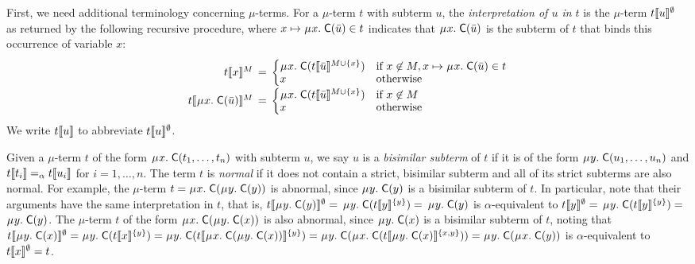 First, we need additional terminology concerning $\mu$-terms.
For a $\mu$-term $t$ with subterm $u$,
the \emph{interpretation of\/ $u$ in\/ $t$} is the $\mu$-term $t\llbracket u \rrbracket^\emptyset$ as returned by the following recursive procedure,
where $x \mapsto \MU x.\; \const{C}( \vec u ) \in t$ indicates that $\MU x.\; \const{C}( \vec u )$ is the subterm of $t$ that binds this occurrence of variable $x$:
\[\begin{array}{r@{}c@{}l}
t\interp{x}^M & {} \,=\, {} &
\textstyle\begin{cases}
    \MU x.\; \const{C}( t\interp{ \vec u}^{M \mathrel\cup \{ x \}}) & \text{if }x \not\in M, x \mapsto \MU x.\; \const{C}( \vec u ) \in t  \\[-\jot]
    x & \text{otherwise}
\end{cases} \\
t\interp{\MU x.\; \const{C}( \vec u )}^M & = &
\textstyle\begin{cases}
    \MU x.\; \const{C}( t\interp{ \vec u }^{M \mathrel\cup \{ x \}} ) & \text{if }x \not\in M \\[-\jot]
    x & \text{otherwise}
\end{cases}
\end{array}\]
We write $t\llbracket u \rrbracket$ to abbreviate $t\llbracket u \rrbracket^\emptyset$.

Given a $\mu$-term $t$ of the form $\MU x.\; \const{C}( t_1, \ldots, t_n )$ with subterm $u$,
we say $u$ is a \emph{bisimilar subterm} of $t$ if it is of the form
$\MU y.\; \const{C}( u_1, \ldots, u_n )$ and $t\llbracket  t_i  \rrbracket \mathrel{=_\alpha} t\llbracket  u_i  \rrbracket$ for $i = 1,\ldots, n$.
The term $t$ is \emph{normal} if it does not contain a strict, bisimilar subterm
and all of its strict subterms are also normal.
For example, the $\mu$-term $t = \MU x.\; \const{C}( \MU y.\; \const{C}( y ) )$ is abnormal,
since $\MU y.\; \const{C}( y )$ is a bisimilar subterm of $t$.
In particular, note that their arguments have the same interpretation in $t$,
that is,
$t\interp{\MU y.\; \const{C}( y )}^\emptyset =$
$\MU y.\; \const{C}( t\interp{y}^{\{y\}} ) =$
$\MU y.\; \const{C}( y )$
is $\alpha$-equivalent to
$t\llbracket y \rrbracket^\emptyset =$
$\MU y.\; \const{C}( t\interp{y}^{\{y\}} ) =$
$\MU y.\; \const{C}( y )$.
The $\mu$-term $t$ of the form $\MU x.\; \const{C}( \MU y.\; \const{C}( x ) )$ is also abnormal,
since $\MU y.\; \const{C}( x )$ is a bisimilar subterm of $t$,
noting that
$t\interp{\MU y.\; \const{C}( x )}^\emptyset =
\MU y.\; \const{C}( t\interp{x}^{\{y\}} ) =
\MU y.\; \const{C}( t\interp{\MU x.\; \const{C}( \MU y.\; \const{C}( x ) ) }^{\{y\}} ) =
\MU y.\; \const{C}( \MU x.\; \const{C}( t\interp{\MU y.\; \const{C}( x )}^{\{x,y\}} ) ) =
\MU y.\allowbreak\; \const{C}( \MU x.\; \const{C}( y ) )$
is $\alpha$-equivalent to $t\llbracket x \rrbracket^\emptyset = t$.

